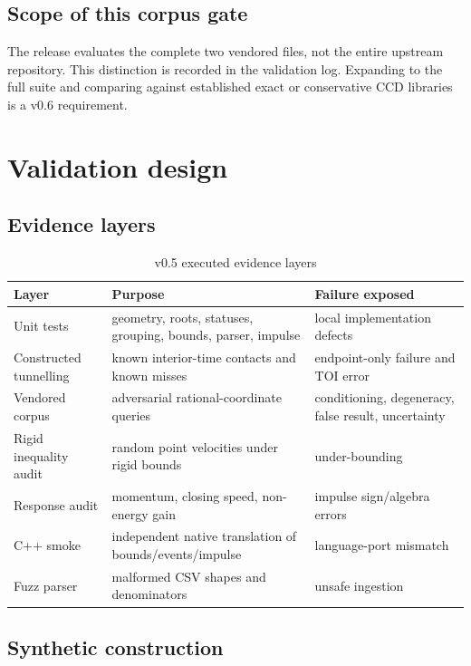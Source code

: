 \documentclass[11pt,a4paper,oneside]{book}
\begin{document}
\section{Scope of this corpus gate}

The release evaluates the complete two vendored files, not the entire upstream repository. This distinction is recorded in the validation log. Expanding to the full suite and comparing against established exact or conservative CCD libraries is a v0.6 requirement.

\chapter{Validation design}
\section{Evidence layers}

\begin{table}[H]
\centering
\caption{v0.5 executed evidence layers}
\begin{tabularx}{\textwidth}{p{}X p{}}
\toprule
Layer & Purpose & Failure exposed\\
\midrule
Unit tests & geometry, roots, statuses, grouping, bounds, parser, impulse & local implementation defects\\
Constructed tunnelling & known interior-time contacts and known misses & endpoint-only failure and TOI error\\
Vendored corpus & adversarial rational-coordinate queries & conditioning, degeneracy, false result, uncertainty\\
Rigid inequality audit & random point velocities under rigid bounds & under-bounding\\
Response audit & momentum, closing speed, non-energy gain & impulse sign/algebra errors\\
C++ smoke & independent native translation of bounds/events/impulse & language-port mismatch\\
Fuzz parser & malformed CSV shapes and denominators & unsafe ingestion\\
\bottomrule
\end{tabularx}
\end{table}

\section{Synthetic construction}
\end{document}
